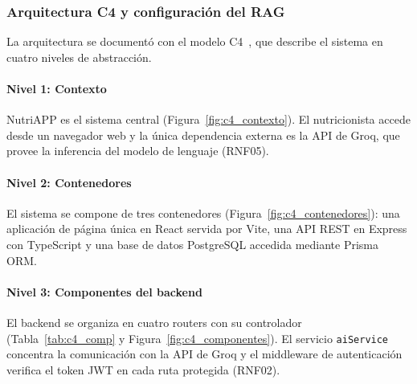 \subsubsection{Arquitectura C4 y configuración del RAG}

La arquitectura se documentó con el modelo C4~\cite{brown2024c4}, que describe
el sistema en cuatro niveles de abstracción.

\paragraph{Nivel 1: Contexto}

NutriAPP es el sistema central (Figura~\ref{fig:c4_contexto}). El nutricionista
accede desde un navegador web y la única dependencia externa es la API de Groq,
que provee la inferencia del modelo de lenguaje (RNF05).


\paragraph{Nivel 2: Contenedores}

El sistema se compone de tres contenedores (Figura~\ref{fig:c4_contenedores}):
una aplicación de página única en React servida por Vite, una API REST en
Express con TypeScript y una base de datos PostgreSQL accedida mediante Prisma ORM.


\paragraph{Nivel 3: Componentes del backend}

El backend se organiza en cuatro routers con su controlador
(Tabla~\ref{tab:c4_comp} y Figura~\ref{fig:c4_componentes}). El servicio
\texttt{aiService} concentra la comunicación con la API de Groq y el middleware
de autenticación verifica el token JWT en cada ruta protegida (RNF02).


